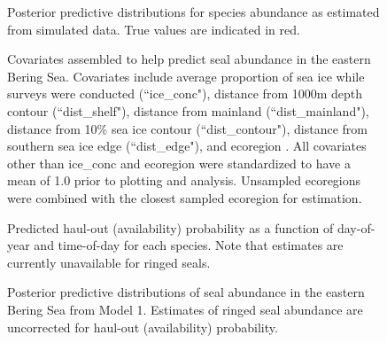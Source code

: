 \documentclass[12pt,fleqn]{article}
\begin{document}
\begin{flushleft}
\begin{figure}
\begin{center}
\end{center}
\caption{Posterior predictive distributions for species abundance as estimated from simulated data.  True values are indicated
in red.}
\label{fig:sim_N}
\end{figure}

\begin{figure}
\begin{center}
\end{center}
\caption{Covariates assembled to help predict seal abundance in the eastern Bering Sea. Covariates include average proportion of sea ice while surveys were conducted (``ice\_conc"), distance from 1000m depth contour (``dist\_shelf"), distance from mainland (``dist\_mainland"), distance from 10\% sea ice contour (``dist\_contour"), distance from southern sea ice edge (``dist\_edge"), and ecoregion \citep[see][]{PiattSpringer2007}.  All covariates other than ice\_conc and ecoregion were standardized to have a mean of 1.0 prior to plotting and analysis.  Unsampled ecoregions were combined with the closest sampled ecoregion for estimation. }
\label{fig:covs}
\end{figure}

\begin{figure}[htb!]
\begin{center}
\end{center}
\caption{Predicted haul-out (availability) probability as a function of day-of-year and time-of-day for each species.  Note that estimates are currently unavailable for ringed seals.}
\label{fig:HO}
\end{figure}

\begin{figure}
\begin{center}
\end{center}
\caption{Posterior predictive distributions of seal abundance in the eastern Bering Sea from Model 1.  Estimates of ringed seal abundance are uncorrected for haul-out (availability) probability.}
\label{fig:N}
\end{figure}


\end{flushleft}
\end{document}
